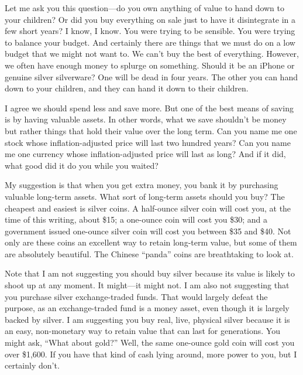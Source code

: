 \documentclass[letterpaper]{article}
\begin{document}
{\color{black}
Let me ask you this question—do you own anything of value to hand down
to your children?  Or did you buy everything on sale just to have it
disintegrate in a few short years?  I know, I know. You were trying to
be sensible. You were trying to balance your budget. And certainly
there are things that we must do on a low budget that we might not want
to. We can’t buy the best of everything. However, we often have enough
money to splurge on something. Should it be an iPhone or genuine silver
silverware?  One will be dead in four years. The other you can hand
down to your children, and they can hand it down to their children.}

{\color{black}
I agree we should spend less and save more. But one of the best means of
saving is by having valuable assets. In other words, what we save
shouldn’t be money but rather things that hold their value over the
long term. Can you name me one stock whose inflation-adjusted price
will last two hundred years?  Can you name me one currency whose
inflation-adjusted price will last as long?  And if it did, what good
did it do you while you waited?}

{\color{black}
My suggestion is that when you get extra money, you bank it by
purchasing valuable long-term assets. What sort of long-term assets
should you buy? The cheapest and easiest is silver coins. A half-ounce
silver coin will cost you, at the time of this writing, about \$15; a
one-ounce coin will cost you \$30; and a government issued one-ounce
silver coin will cost you between \$35 and \$40. Not only are these
coins an excellent way to retain long-term value, but some of them are
absolutely beautiful. The Chinese “panda” coins are breathtaking to
look at.}

{\color{black}
Note that I am not suggesting you should buy silver because its value is
likely to shoot up at any moment. It might—it might not. I am also not
suggesting that you purchase silver exchange-traded funds. That would
largely defeat the purpose, as an exchange-traded fund is a money
asset, even though it is largely backed by silver. I am suggesting you
buy real, live, physical silver because it is an easy, non-monetary way
to retain value that can last for generations. You might ask, “What
about gold?”  Well, the same one-ounce gold coin will cost you over
\$1,600. If you have that kind of cash lying around, more power to you,
but I certainly don’t. }
\end{document}
